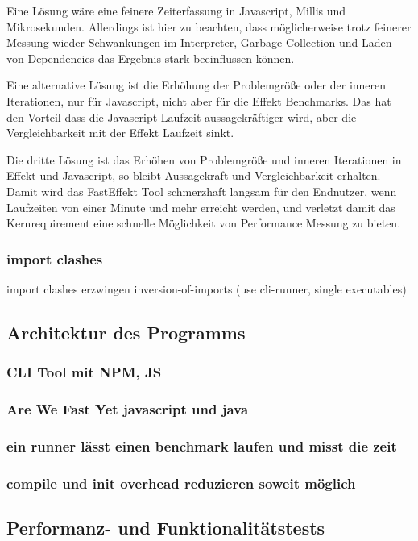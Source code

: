 Eine Lösung wäre eine feinere Zeiterfassung in Javascript, Millis und Mikrosekunden. Allerdings ist hier zu beachten, dass möglicherweise trotz feinerer Messung wieder Schwankungen im Interpreter, Garbage Collection und Laden von Dependencies das Ergebnis stark beeinflussen können.

Eine alternative Lösung ist die Erhöhung der Problemgröße oder der inneren Iterationen, nur für Javascript, nicht aber für die Effekt Benchmarks.
Das hat den Vorteil dass die Javascript Laufzeit aussagekräftiger wird, aber die Vergleichbarkeit mit der Effekt Laufzeit sinkt.

Die dritte Lösung ist das Erhöhen von Problemgröße und inneren Iterationen in Effekt und Javascript, so bleibt Aussagekraft und Vergleichbarkeit erhalten.
Damit wird das FastEffekt Tool schmerzhaft langsam für den Endnutzer, wenn Laufzeiten von einer Minute und mehr erreicht werden, und verletzt damit das Kernrequirement eine schnelle Möglichkeit von Performance Messung zu bieten.

\subsubsection{ import clashes }
import clashes erzwingen inversion-of-imports (use cli-runner, single executables)

\subsection{Architektur des Programms}
\subsubsection{ CLI Tool mit NPM, JS }
\subsubsection{ Are We Fast Yet javascript und java }
\subsubsection{ ein runner lässt einen benchmark laufen und misst die zeit }
\subsubsection{ compile und init overhead reduzieren soweit möglich }
  
\subsection{ Performanz- und Funktionalitätstests }
